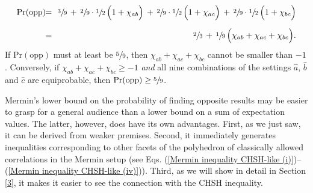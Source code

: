 \begin{eqnarray}
\mathrm{Pr(opp)} & \!\! = \!\! & \sfrac39 \, + \, \sfrac29 \cdot \sfrac12 \, \Big(1+ \chi_{ab} \Big) \, + \, \sfrac29 \cdot \sfrac12 \, \Big(1+ \chi_{ac} \Big) \, + \,  \sfrac29 \cdot \sfrac12 \, \Big(1+ \chi_{bc} \Big) \nonumber \\[.2cm]
 & \!\! = \!\!  & \sfrac{2}{3} \, + \, \sfrac{1}{9} \, \Big(\chi_{ab} + \chi_{ac} + \chi_{bc} \Big). 
 \label{Pr opp general} 
\end{eqnarray}
If $\mathrm{Pr(opp)}$ must at least be $\sfrac59$, then $\chi_{ab} + \chi_{ac} + \chi_{bc}$ cannot be smaller than $-1$. Conversely, if $\chi_{ab} + \chi_{ac} + \chi_{bc} \ge -1$ \emph{and} all nine combinations of the settings $\hat{a}$, $\hat{b}$ and $\hat{c}$ are equiprobable, then 
$\mathrm{Pr(opp)} \ge \sfrac59$. 
 
Mermin's lower bound on the probability of finding opposite results may be easier to grasp for a general audience than a lower bound on a sum of expectation values. The latter, however, does have its own advantages. First, as we just saw, it can be derived from weaker premises. Second, it immediately generates inequalities corresponding to other facets of the polyhedron of classically allowed correlations in the Mermin setup (see Eqs. (\ref{Mermin inequality CHSH-like (i)})--(\ref{Mermin inequality CHSH-like (iv)})). Third, as we will show in detail in Section \ref{3}, it makes it easier to see the connection with the CHSH inequality.

